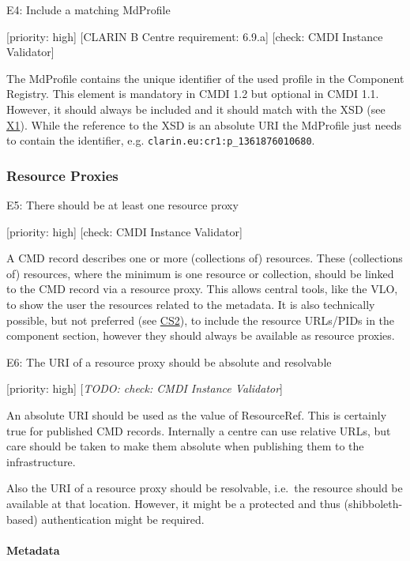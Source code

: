 E4: Include a matching MdProfile

{[}priority: high{]} {[}CLARIN B Centre requirement: 6.9.a{]} {[}check:
CMDI Instance Validator{]}

The MdProfile contains the unique identifier of the used profile in the
Component Registry. This element is mandatory in CMDI 1.2 but optional
in CMDI 1.1. However, it should always be included and it should match
with the XSD (see
\href{/authoring_component_metadata_records/general_xml.md\#x1}{X1}).
While the reference to the XSD is an absolute URI the MdProfile just
needs to contain the identifier, e.g.
\texttt{clarin.eu:cr1:p\_1361876010680}.

\subsubsection{Resource Proxies}\label{resource-proxies}

E5: There should be at least one resource proxy

{[}priority: high{]} {[}check: CMDI Instance Validator{]}

A CMD record describes one or more (collections of) resources. These
(collections of) resources, where the minimum is one resource or
collection, should be linked to the CMD record via a resource proxy.
This allows central tools, like the VLO, to show the user the resources
related to the metadata. It is also technically possible, but not
preferred (see
\href{/authoring_component_metadata_records/the_component_section.md\#cs2}{CS2}),
to include the resource URLs/PIDs in the component section, however they
should always be available as resource proxies.

E6: The URI of a resource proxy should be absolute and resolvable

{[}priority: high{]} {[}\emph{TODO: check: CMDI Instance Validator}{]}

An absolute URI should be used as the value of ResourceRef. This is
certainly true for published CMD records. Internally a centre can use
relative URLs, but care should be taken to make them absolute when
publishing them to the infrastructure.

Also the URI of a resource proxy should be resolvable, i.e.~the resource
should be available at that location. However, it might be a protected
and thus (shibboleth-based) authentication might be required.

\paragraph{Metadata}\label{metadata}

